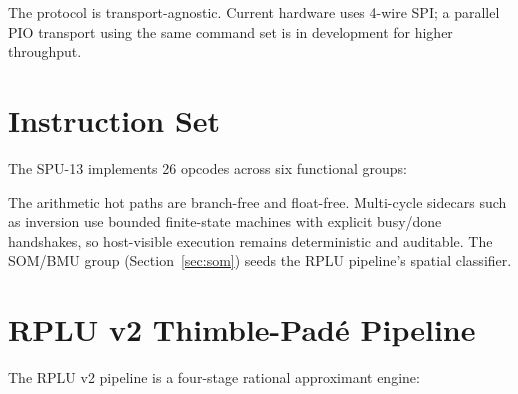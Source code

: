 \documentclass[10pt,twocolumn]{article}
\begin{document}
The protocol is transport-agnostic. Current hardware uses 4-wire SPI; a
parallel PIO transport using the same command set is in development for
higher throughput.

\section{Instruction Set}
\label{sec:isa}

The SPU-13 implements 26 opcodes across six functional groups:

\begin{table}[h]
\centering
{}
\caption{Opcode groups. See \cite{isa_reference} for full encoding.}
\end{table}

The arithmetic hot paths are branch-free and float-free. Multi-cycle sidecars
such as inversion use bounded finite-state machines with explicit busy/done
handshakes, so host-visible execution remains deterministic and auditable.
The SOM/BMU group (Section~\ref{sec:som}) seeds the RPLU pipeline's spatial
classifier.

\section{RPLU v2 Thimble-Pad\'e Pipeline}
\label{sec:rplu}

The RPLU v2 pipeline is a four-stage rational approximant engine:
\end{document}
